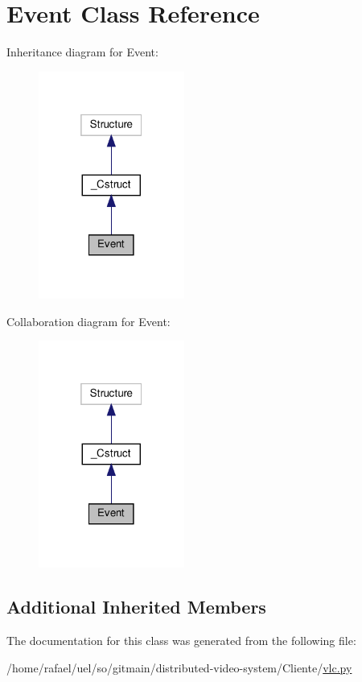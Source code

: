 \hypertarget{classvlc_1_1_event}{}\section{Event Class Reference}
\label{classvlc_1_1_event}


Inheritance diagram for Event\+:
\nopagebreak
\begin{figure}[H]
\begin{center}
\leavevmode
\includegraphics[width=136pt]{classvlc_1_1_event__inherit__graph}
\end{center}
\end{figure}


Collaboration diagram for Event\+:
\nopagebreak
\begin{figure}[H]
\begin{center}
\leavevmode
\includegraphics[width=136pt]{classvlc_1_1_event__coll__graph}
\end{center}
\end{figure}
\subsection*{Additional Inherited Members}


The documentation for this class was generated from the following file\+:\begin{DoxyCompactItemize}
\item 
/home/rafael/uel/so/gitmain/distributed-\/video-\/system/\+Cliente/\hyperlink{vlc_8py}{vlc.\+py}\end{DoxyCompactItemize}

